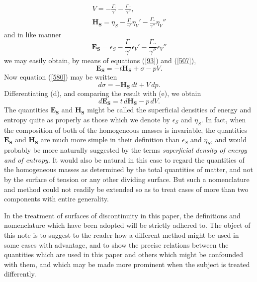 \documentclass[12pt]{article}
\begin{document}
{{\begin{gather} 
V=-\frac{\Gamma_{\prime}}{\gamma'}-\frac{\Gamma_{\prime \prime}}{\gamma''},   \tag{a}\\
\mathbf{H}_\mathbf{S}=\eta_S-\frac{\Gamma_{\prime}}{\gamma'}\eta_{V}' -\frac{\Gamma_{\prime \prime}}{\gamma''}\eta_{V}'' \tag{b}\end{gather}
and in like manner
\begin{equation}
\mathbf{E}_\mathbf{S}=\epsilon_S-\frac{\Gamma_{\prime}}{\gamma'}\epsilon_{V}' -\frac{\Gamma_{\prime \prime}}{\gamma''}\epsilon_{V}'' \tag{c} \end{equation}
we may easily obtain, by means of equations (\ref{93}) and (\ref{507}),
\begin{equation} \mathbf{E}_\mathbf{S}=-t\mathbf{H}_\mathbf{S}+ \sigma -pV. \tag{d} \end{equation}
Now equation (\ref{580}) may be written
\begin{equation} d\sigma = -\mathbf{H}_\mathbf{S} \, dt + V \, dp. \tag{e} \end{equation}
Differentiating (d), and comparing the result with (e), we obtain
\begin{equation}
d\mathbf{E}_\mathbf{S}=t\,d\mathbf{H}_\mathbf{S}-p \, dV. \tag{f} \end{equation}
The quantities $\mathbf{E}_\mathbf{S}$ and $\mathbf{H}_\mathbf{S}$ might be called the superficial densities of energy and entropy quite as properly as those which we denote by $\epsilon_S$ and $\eta_S$. In fact, when the composition of both of the homogeneous masses is invariable, the quantities $\mathbf{E}_\mathbf{S}$ and $\mathbf{H}_\mathbf{S}$ are much more simple in their definition than $\epsilon_S$ and $\eta_S$, and would probably be more naturally suggested by the terms \textit{superficial density of energy and of entropy}. It would also be natural in this case to regard the quantities of the homogeneous masses as determined by the total quantities of matter, and not by the surface of tension or any other dividing surface. But such a nomenclature and method could not readily be extended so as to treat cases of more than two components with entire generality. \par
In the treatment of surfaces of discontinuity in this paper, the definitions and nomenclature which have been adopted will be strictly adhered to. The object of this note is to suggest to the reader how a different method might be used in some cases with advantage, and to show the precise relations between the quantities which are used in this paper and others which might be confounded with them, and which may be made more prominent when the subject is treated differently.}

}
\end{document}
